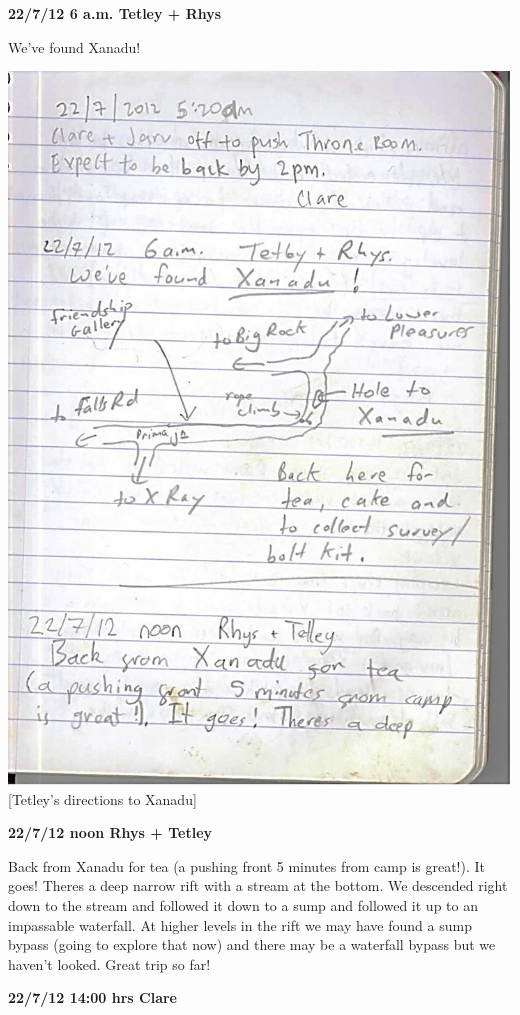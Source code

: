 \textbf{22/7/12 6 a.m. Tetley + Rhys}

We've found Xanadu!

\includegraphics{UgLog1012/67.jpeg}\\
{[}Tetley's directions to Xanadu{]}

\textbf{22/7/12 noon Rhys + Tetley}

Back from Xanadu for tea (a pushing front 5 minutes from camp is
great!). It goes! Theres a deep narrow rift with a stream at the bottom.
We descended right down to the stream and followed it down to a sump and
followed it up to an impassable waterfall. At higher levels in the rift
we may have found a sump bypass (going to explore that now) and there
may be a waterfall bypass but we haven't looked. Great trip so far!

\textbf{22/7/12 14:00 hrs Clare}

